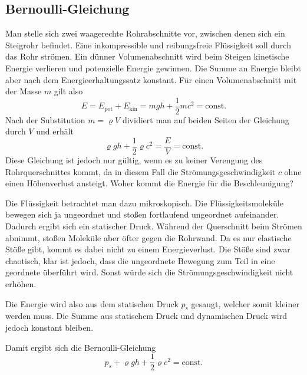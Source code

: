 \documentclass[a4paper,10pt,fleqn,twocolumn,twoside]{scrartcl}
\begin{document}
\subsection{Bernoulli-Gleichung}

Man stelle sich zwei waagerechte Rohrabschnitte vor, zwischen denen
sich ein Steigrohr befindet. Eine inkompressible und reibungsfreie
Flüssigkeit soll durch das Rohr strömen. Ein dünner Volumenabschnitt wird beim
Steigen kinetische Energie verlieren und potenzielle Energie
gewinnen. Die Summe an Energie bleibt aber nach dem Energieerhaltungssatz
konstant. Für einen Volumenabschnitt mit der Masse \(m\) gilt also
\[E=E_\mathrm{pot}+E_\mathrm{kin}
=mgh+\frac{1}{2}mc^2=\mathrm{const}.\]
Nach der Substitution \(m=\varrho V\) dividiert
man auf beiden Seiten der Gleichung durch \(V\) und erhält
\[\varrho gh+\frac{1}{2}\varrho c^2=\frac{E}{V}=\mathrm{const}.
\]
Diese Gleichung ist jedoch nur gültig, wenn es zu keiner
Verengung des Rohrquerschnittes kommt, da in diesem Fall die
Strömungsgeschwindigkeit \(c\) ohne einen Höhenverlust ansteigt.
Woher kommt die Energie für die Beschleunigung?

Die Flüssigkeit betrachtet man dazu mikroskopisch.
Die Flüssigkeitsmoleküle bewegen sich ja ungeordnet und stoßen
fortlaufend ungeordnet aufeinander. Dadurch ergibt sich ein
statischer Druck. Während der Querschnitt beim Strömen abnimmt,
stoßen Moleküle aber öfter gegen die Rohrwand. Da es nur
elastische Stöße gibt, kommt es dabei nicht zu einem Energieverlust.
Die Stöße sind zwar chaotisch, klar ist jedoch, dass die ungeordnete
Bewegung zum Teil in eine geordnete überführt wird. Sonst würde
sich die Strömungsgeschwindigkeit nicht erhöhen.

Die Energie wird also aus dem statischen Druck \(p_s\) gesaugt,
welcher somit kleiner werden muss. Die Summe aus statischem
Druck und dynamischen Druck wird jedoch konstant bleiben.

Damit ergibt sich die Bernoulli-Gleichung
\[p_s+\varrho gh+\frac{1}{2}\varrho c^2 = \mathrm{const}.\]
\end{document}
